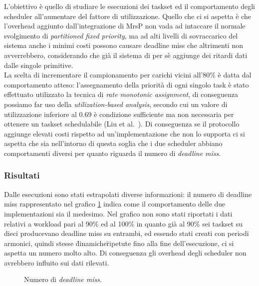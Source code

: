 \noindent L'obiettivo è quello di studiare le esecuzioni dei taskset ed il comportamento degli scheduler all'aumentare del fattore di utilizzazione. Quello che ci si aspetta è che l'overhead aggiunto dall'integrazione di MrsP non vada ad intaccare il normale svolgimento di \textit{partitioned fixed priority}, ma ad alti livelli di sovraccarico del sistema anche i minimi costi possono causare deadline miss che altrimenti non avverrebbero, considerando che già il sistema di per sè aggiunge dei ritardi dati dalle singole primitive.\\

\noindent La scelta di incrementare il campionamento per carichi vicini all'80\% è datta dal comportamento atteso: l'assegnamento della priorità di ogni singolo task è stato effettuato utilizzato la tecnica di \textit{rate monotonic assignment}, di conseguenza possiamo far uso della \textit{utilization-based analysis}, secondo cui un valore di utilizzazione inferiore al 0.69 è condizione sufficiente ma non necessaria per ottenere un taskset schedulabile (Liu et al.~\cite{Liu:1973:SAM:321738.321743}). Di conseguenza se il protocollo aggiunge elevati costi rispetto ad un'implementazione che non lo supporta ci si aspetta che sia nell'intorno di questa soglia che i due scheduler abbiano comportamenti diversi per quanto riguarda il numero di \textit{deadline miss}.\\

\subsubsection{Risultati}
\label{sec:confronto_norisorsa_ris}

\noindent Dalle esecuzioni sono stati estrapolati diverse informazioni: il numero di deadline miss rappresentato nel grafico \ref{fig:DLM} indica come il comportamento delle due implementazioni sia il medesimo. Nel grafico non sono stati riportati i dati relativi a workload pari al 90\% ed al 100\% in quanto già al 90\% sei taskset su dieci producevano deadline miss su entrambi, ed essendo stati creati con periodi armonici, quindi stesse \"dinamiche\" ripetute fino alla fine dell'esecuzione, ci si aspetta un numero molto alto. Di conseguenza gli overhead degli scheduler non avrebbero influito sui dati rilevati.\\

  \begin{figure}
    \graficoUno
    \caption{Numero di \textit{deadline miss}.} %
    \label{fig:DLM}
  \end{figure}


